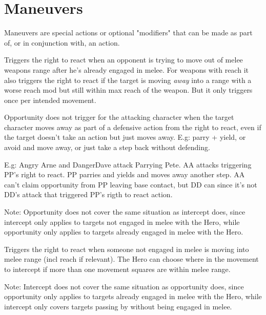 








\section*{Maneuvers}


Maneuvers are special actions or optional "modifiers" that can be made as part of, or in conjunction with, an action.

\openskillslist


Triggers the right to react when an opponent is trying to move out of melee weapons range after he's already engaged in melee. For weapons with reach it also triggers the right to react if the target is moving \emph{away} into a range with a worse reach mod but still within max reach of the weapon. But it only triggers once per intended movement.

Opportunity does not trigger for the attacking character when the target character moves away as part of a defensive action from the right to react, even if the target doesn't take an action but just moves away. E.g: parry + yield, or avoid and move away, or just take a step back without defending.

E.g: Angry Arne and DangerDave attack Parrying Pete. AA attacks triggering PP's right to react. PP parries and yields and moves away another step. AA can't claim opportunity from PP leaving base contact, but DD can since it's not DD's attack that triggered PP's rigth to react action.

Note: Opportunity does not cover the same situation as intercept does, since intercept only applies to targets not engaged in melee with the Hero, while opportunity only applies to targets already engaged in melee with the Hero.


Triggers the right to react when someone not engaged in melee is moving into melee range (incl reach if relevant). The Hero can choose where in the movement to intercept if more than one movement squares are within melee range.

Note: Intercept does not cover the same situation as opportunity does, since opportunity only applies to targets already engaged in melee with the Hero, while intercept only covers targets passing by without being engaged in melee.

